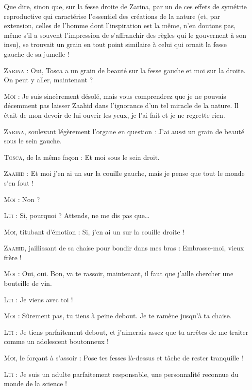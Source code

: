 Que dire, sinon que, sur la fesse droite de Zarina, par un de ces effets de symétrie reproductive qui caractérise l’essentiel des créations de la nature (et, par extension, celles de l’homme dont l’inspiration est la même, n’en doutons pas, même s’il a souvent l’impression de s’affranchir des règles qui le gouvernent à son insu), se trouvait un grain en tout point similaire à celui qui ornait la fesse gauche de sa jumelle !

\begin{dialogue}

\textsc{Zarina} : Oui, Tosca a un grain de beauté sur la fesse gauche et moi sur la droite. On peut y aller, maintenant ?

\textsc{Moi} : Je suis sincèrement désolé, mais vous comprendrez que je ne pouvais décemment pas laisser Zaahid dans l’ignorance d’un tel miracle de la nature. Il était de mon devoir de lui ouvrir les yeux, je l’ai fait et je ne regrette rien.

\textsc{Zarina}, soulevant légèrement l’organe en question : J’ai aussi un grain de beauté sous le sein gauche.

\textsc{Tosca}, de la même façon : Et moi sous le sein droit.

\textsc{Zaahid} : Et moi j’en ai un sur la couille gauche, mais je pense que tout le monde s’en fout !

\textsc{Moi} : Non ?

\textsc{Lui} : Si, pourquoi ? Attends, ne me dis pas que…

\textsc{Moi}, titubant d’émotion : Si, j’en ai un sur la couille droite !

\textsc{Zaahid}, jaillissant de sa chaise pour bondir dans mes bras : Embrasse-moi, vieux frère !

\textsc{Moi} : Oui, oui. Bon, va te rassoir, maintenant, il faut que j’aille chercher une bouteille de vin.

\textsc{Lui} : Je viens avec toi !

\textsc{Moi} : Sûrement pas, tu tiens à peine debout. Je te ramène jusqu’à ta chaise.

\textsc{Lui} : Je tiens parfaitement debout, et j’aimerais assez que tu arrêtes de me traiter comme un adolescent boutonneux !

\textsc{Moi}, le forçant à s’assoir : Pose tes fesses là-dessus et tâche de rester tranquille !

\textsc{Lui} : Je suis un adulte parfaitement responsable, une personnalité reconnue du monde de la science !


\end{dialogue}

